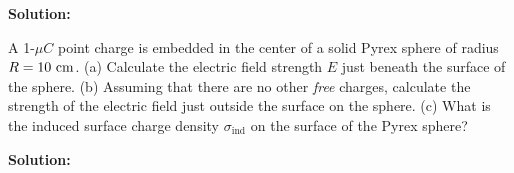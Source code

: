 \documentclass[11pt]{article}
\begin{document}
\textbf{Solution:}


\clearpage

\begin{problem}[\P (E29.29)]
A 1-$\mu C$ point charge is embedded in the center of a solid Pyrex sphere of radius $R=10~\mathrm{cm}$. (a) Calculate the electric field strength $E$ just beneath the surface of the sphere. (b) Assuming that there are no other \textit{free} charges, calculate the strength of the electric field just outside the surface on the sphere. (c) What is the induced surface
charge density $\sigma_{\text{ind}}$ on the surface of the Pyrex sphere?
\end{problem}


\textbf{Solution:}


\clearpage
\end{document}
